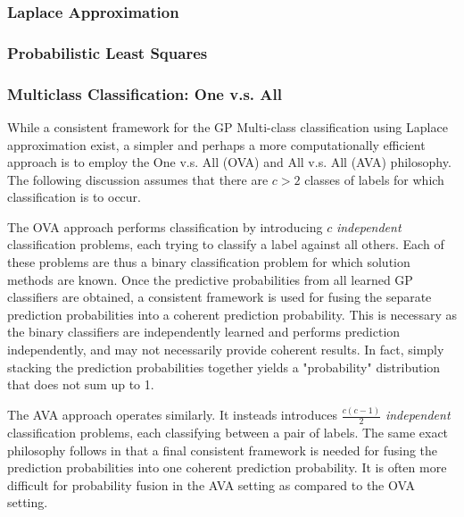 			\subsubsection{Laplace Approximation}
			\label{Background:GaussianProcesses:Classification:LaplaceApproximation}
			
			\subsubsection{Probabilistic Least Squares}
			\label{Background:GaussianProcesses:Classification:ProbabilisticLeastSquares}
			
			\subsubsection{Multiclass Classification: One v.s. All}
			\label{Background:GaussianProcesses:Classification:OVA}
			
				While a consistent framework for the GP Multi-class classification using Laplace approximation exist, a simpler and perhaps a more computationally efficient approach is to employ the One v.s. All (OVA) and All v.s. All (AVA) philosophy. The following discussion assumes that there are $c > 2$ classes of labels for which classification is to occur. 
				
				The OVA approach performs classification by introducing $c$ \textit{independent} classification problems, each trying to classify a label against all others. Each of these problems are thus a binary classification problem for which solution methods are known. Once the predictive probabilities from all learned GP classifiers are obtained, a consistent framework is used for fusing the separate prediction probabilities into a coherent prediction probability. This is necessary as the binary classifiers are independently learned and performs prediction independently, and may not necessarily provide coherent results. In fact, simply stacking the prediction probabilities together yields a "probability" distribution that does not sum up to 1.
				
				The AVA approach operates similarly. It insteads introduces $\frac{c (c - 1)}{2}$ \textit{independent} classification problems, each classifying between a pair of labels. The same exact philosophy follows in that a final consistent framework is needed for fusing the prediction probabilities into one coherent prediction probability. It is often more difficult for probability fusion in the AVA setting as compared to the OVA setting.
			
